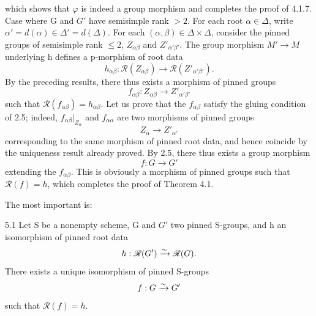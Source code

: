 which shows that $\varphi$ is indeed a group morphism and completes the proof of 4.1.7.
Case where G and $G'$ have semisimple rank $>2$. For each root $\alpha\in\Delta$, write $\alpha'=d(\alpha)\in\Delta'=d(\Delta)$. For each $(\alpha,\beta)\in\Delta\times\Delta$, consider the pinned groups of semisimple rank $\leq2$, $Z_{\alpha\beta}$ and $Z'_{\alpha'\beta'}$. The group morphism $M'\to M$ underlying h defines a p-morphism of root data
\[
h_{\alpha\beta}:\mathscr R(Z_{\alpha\beta})\to\mathscr R(Z'_{\alpha'\beta'}).
\]
By the preceding results, there thus exists a morphism of pinned groups
\[
f_{\alpha\beta}:Z_{\alpha\beta}\to Z'_{\alpha'\beta'}
\]
such that $\mathscr R(f_{\alpha\beta})=h_{\alpha\beta}$. Let us prove that the $f_{\alpha\beta}$ satisfy the gluing condition of 2.5; indeed, $f_{\alpha\beta}|_{Z_\alpha}$ and $f_{\alpha\alpha}$ are two morphisms of pinned groups
\[
Z_\alpha\to Z'_{\alpha'}
\]
corresponding to the same morphism of pinned root data, and hence coincide by the uniqueness result already proved. By 2.5, there thus exists a group morphism
\[
f:G\to G'
\]
extending the $f_{\alpha\beta}$. This is obviously a morphism of pinned groups such that $\mathscr R(f)=h$, which completes the proof of Theorem 4.1.

The most important is:
\begin{corollary}{5.1}\label{XXIII.5.1}
Let S be a nonempty scheme, G and $G'$ two pinned S-groups, and h an isomorphism of pinned root data
\[
h:\mathscr R(G')\xrightarrow{\sim}\mathscr R(G).
\]
There exists a unique isomorphism of pinned S-groups
\[
f:G\xrightarrow{\sim} G'
\]
such that $\mathscr R(f)=h$.
\end{corollary}
